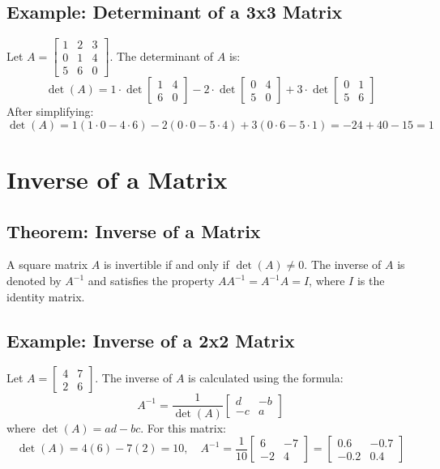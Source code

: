 \subsection{Example: Determinant of a 3x3 Matrix}
\begin{example}
Let $A = \begin{bmatrix} 1 & 2 & 3 \\ 0 & 1 & 4 \\ 5 & 6 & 0 \end{bmatrix}$. The determinant of $A$ is:
\[
\det(A) = 1 \cdot \det\begin{bmatrix} 1 & 4 \\ 6 & 0 \end{bmatrix} - 2 \cdot \det\begin{bmatrix} 0 & 4 \\ 5 & 0 \end{bmatrix} + 3 \cdot \det\begin{bmatrix} 0 & 1 \\ 5 & 6 \end{bmatrix}
\]
After simplifying:
\[
\det(A) = 1(1 \cdot 0 - 4 \cdot 6) - 2(0 \cdot 0 - 5 \cdot 4) + 3(0 \cdot 6 - 5 \cdot 1) = -24 + 40 - 15 = 1
\]
\end{example}


\section{Inverse of a Matrix}

\subsection{Theorem: Inverse of a Matrix}
\begin{theorem}
A square matrix $A$ is invertible if and only if $\det(A) \neq 0$. The inverse of $A$ is denoted by $A^{-1}$ and satisfies the property $AA^{-1} = A^{-1}A = I$, where $I$ is the identity matrix.
\end{theorem}

\subsection{Example: Inverse of a 2x2 Matrix}
\begin{example}
Let $A = \begin{bmatrix} 4 & 7 \\ 2 & 6 \end{bmatrix}$. The inverse of $A$ is calculated using the formula:
\[
A^{-1} = \frac{1}{\det(A)} \begin{bmatrix} d & -b \\ -c & a \end{bmatrix}
\]
where $\det(A) = ad - bc$. For this matrix:
\[
\det(A) = 4(6) - 7(2) = 10, \quad A^{-1} = \frac{1}{10} \begin{bmatrix} 6 & -7 \\ -2 & 4 \end{bmatrix} = \begin{bmatrix} 0.6 & -0.7 \\ -0.2 & 0.4 \end{bmatrix}
\]
\end{example}

